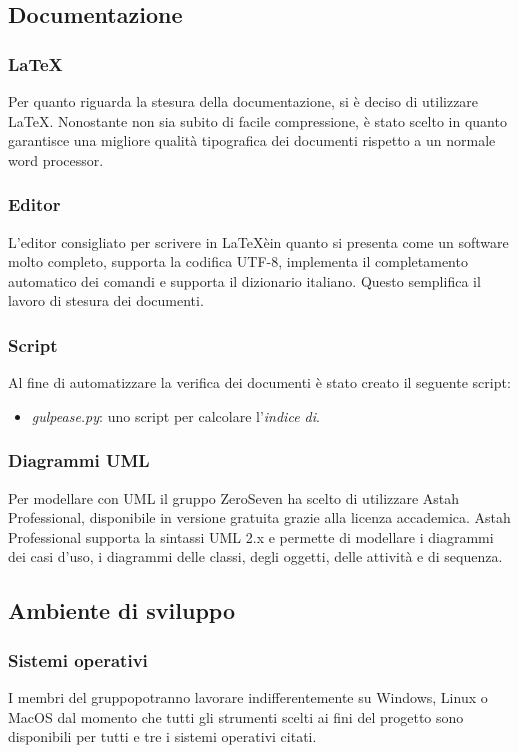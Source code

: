\subsection{Documentazione}
\subsubsection{\LaTeX}
Per quanto riguarda la stesura della documentazione, si è deciso di utilizzare \LaTeX. Nonostante non sia subito di facile compressione, è stato scelto in quanto garantisce una migliore qualità tipografica dei documenti rispetto a un normale word processor.
\subsubsection{Editor}
 L'editor consigliato per scrivere in \LaTeX èin quanto si presenta come un software molto completo, supporta la codifica UTF-8, implementa il completamento automatico dei comandi e supporta il dizionario italiano. Questo semplifica il lavoro di stesura dei documenti.
 \subsubsection{Script}
Al fine di automatizzare la verifica dei documenti è stato creato il seguente script:
\begin{itemize}
	\item \textit{gulpease.py}: uno script per calcolare l'\textit{indice di}.
\end{itemize} 
\subsubsection{Diagrammi UML}
Per modellare con UML il gruppo ZeroSeven ha scelto di utilizzare Astah Professional, disponibile in versione gratuita grazie alla licenza accademica. Astah Professional supporta la sintassi UML 2.x e permette di modellare i diagrammi dei casi d'uso, i diagrammi delle classi, degli oggetti, delle attività e di sequenza. 
\subsection{Ambiente di sviluppo}
\subsubsection{Sistemi operativi}
I membri del gruppopotranno lavorare indifferentemente su Windows, Linux o MacOS dal momento che tutti gli strumenti scelti ai fini del progetto sono disponibili per tutti e tre i sistemi operativi citati. 
